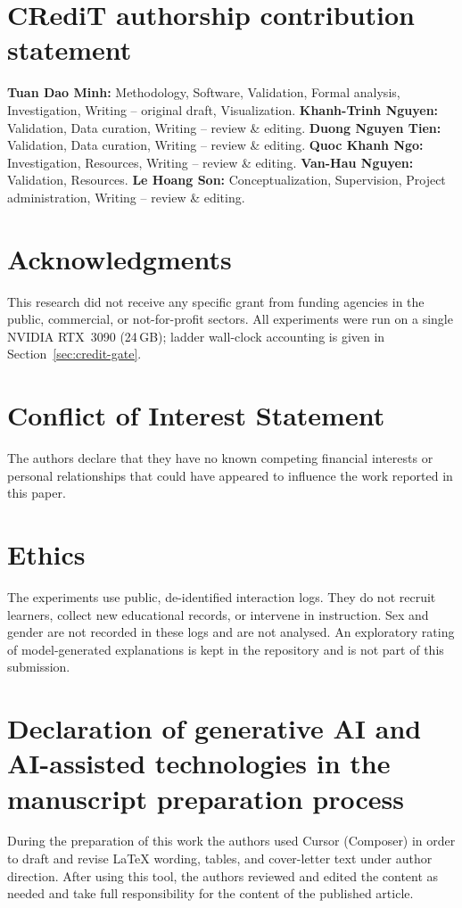 \documentclass[review,12pt]{elsarticle}
\begin{document}
\section*{CRediT authorship contribution statement}
\textbf{Tuan Dao Minh:} Methodology, Software, Validation, Formal analysis,
Investigation, Writing -- original draft, Visualization.
\textbf{Khanh-Trinh Nguyen:} Validation, Data curation, Writing -- review \&
editing.
\textbf{Duong Nguyen Tien:} Validation, Data curation, Writing -- review \&
editing.
\textbf{Quoc Khanh Ngo:} Investigation, Resources, Writing -- review \&
editing.
\textbf{Van-Hau Nguyen:} Validation, Resources.
\textbf{Le Hoang Son:} Conceptualization, Supervision, Project
administration, Writing -- review \& editing.

\section*{Acknowledgments}
This research did not receive any specific grant from funding agencies
in the public, commercial, or not-for-profit sectors. All experiments
were run on a single NVIDIA RTX~3090 (24\,GB); ladder wall-clock
accounting is given in Section~\ref{sec:credit-gate}.

\section*{Conflict of Interest Statement}
The authors declare that they have no known competing financial interests
or personal relationships that could have appeared to influence the work
reported in this paper.

\section*{Ethics}
The experiments use public, de-identified interaction logs. They do not
recruit learners, collect new educational records, or intervene in
instruction. Sex and gender are not recorded in these logs and are not
analysed. An exploratory rating of model-generated explanations is kept
in the repository and is not part of this submission.

\section*{Declaration of generative AI and AI-assisted technologies
in the manuscript preparation process}
During the preparation of this work the authors used Cursor (Composer)
in order to draft and revise LaTeX wording, tables, and cover-letter
text under author direction. After using this tool, the authors reviewed
and edited the content as needed and take full responsibility for the
content of the published article.
\end{document}
